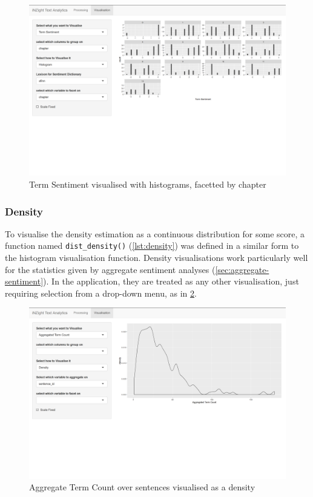\documentclass[11pt, a4paper, titlepage]{report}
\begin{document}
\begin{figure}
  \centering
  \includegraphics[scale=0.35]{visualisation-term-sentiment-hist-facet.png}
  \caption{Term Sentiment visualised with histograms, facetted by
    chapter\label{fig:visualisation-term-sentiment-hist-facet}}
\end{figure}

\subsubsection{Density}\label{sec:density}

To visualise the density estimation as a continuous distribution for
some score, a function named \texttt{dist_density()}
(\underline{\cref{lst:density}}) was defined in a similar form to the
histogram visualisation function. Density visualisations work
particularly well for the statistics given by aggregate sentiment
analyses (\underline{\cref{sec:aggregate-sentiment}}). In the
application, they are treated as any other visualisation, just
requiring selection from a drop-down menu, as in
\underline{\cref{fig:visualisation-agg-term-count-density}}.

\begin{figure}
  \centering
  \includegraphics[scale=0.35]{visualisation-agg-term-count-density.png}
  \caption{Aggregate Term Count over sentences visualised as a
    density\label{fig:visualisation-agg-term-count-density}}
\end{figure}
\end{document}
